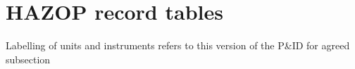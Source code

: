 \section{HAZOP record tables}

Labelling of units and instruments refers to this version of the P\&ID for agreed subsection 







